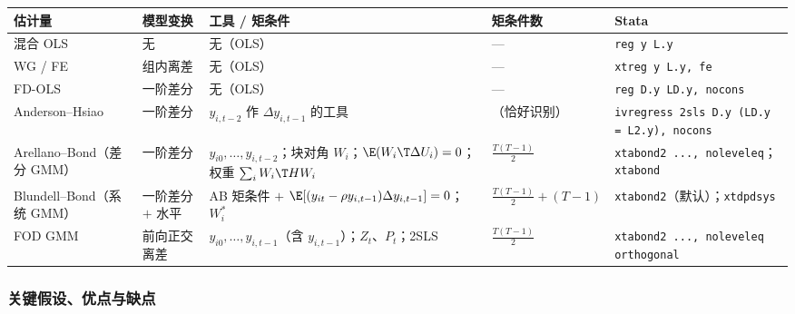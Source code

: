 \begin{center}
\footnotesize
\renewcommand{\arraystretch}{1.3}
\begin{tabularx}{\linewidth}{>{\raggedright\arraybackslash}p{1.75cm}>{\raggedright\arraybackslash}p{1.45cm}L>{\raggedright\arraybackslash}p{2.45cm}>{\raggedright\arraybackslash}p{3.3cm}}
\toprule
估计量 & 模型变换 & 工具 / 矩条件 & 矩条件数 & Stata\\
\midrule
混合 OLS & 无 & 无（OLS） & — & \texttt{reg y L.y}\\
WG / FE & 组内离差 & 无（OLS） & — & \texttt{xtreg y L.y, fe}\\
FD-OLS & 一阶差分 & 无（OLS） & — & \texttt{reg D.y LD.y, nocons}\\
Anderson--Hsiao & 一阶差分 & $y_{i,t-2}$ 作 $\Delta y_{i,t-1}$ 的工具 & 1（恰好识别） & \texttt{ivregress 2sls D.y (LD.y = L2.y), nocons}\\
Arellano--Bond（差分 GMM） & 一阶差分 & $y_{i0},\dots,y_{i,t-2}$；块对角 $W_i$；$\E(W_i\T\Delta U_i)=0$；权重 $\sum_iW_i\T HW_i$ & $\frac{T(T-1)}{2}$ & \texttt{xtabond2 ..., noleveleq}；\texttt{xtabond}\\
Blundell--Bond（系统 GMM） & 一阶差分 $+$ 水平 & AB 矩条件 $+$ $\E[(y_{it}-\rho y_{i,t-1})\Delta y_{i,t-1}]=0$；$W_i^*$ & $\frac{T(T-1)}{2}+(T-1)$ & \texttt{xtabond2}（默认）；\texttt{xtdpdsys}\\
FOD GMM & 前向正交离差 & $y_{i0},\dots,y_{i,t-1}$（含 $y_{i,t-1}$）；$Z_t$、$P_t$；2SLS & $\frac{T(T-1)}{2}$ & \texttt{xtabond2 ..., noleveleq orthogonal}\\
\bottomrule
\end{tabularx}
\label{tab:U12c-comp1}
\end{center}

\subsubsection{关键假设、优点与缺点}

